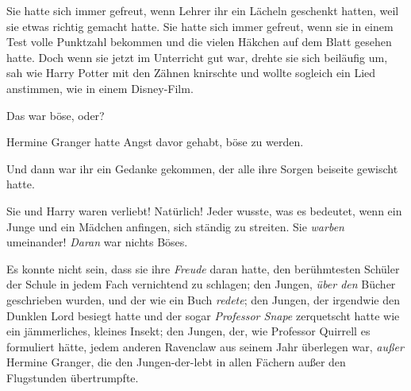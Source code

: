Sie hatte sich immer gefreut, wenn Lehrer ihr ein Lächeln geschenkt hatten, weil sie etwas richtig gemacht hatte. Sie hatte sich immer gefreut, wenn sie in einem Test volle Punktzahl bekommen und die vielen Häkchen auf dem Blatt gesehen hatte. Doch wenn sie jetzt im Unterricht gut war, drehte sie sich beiläufig um, sah wie Harry Potter mit den Zähnen knirschte und wollte sogleich ein Lied anstimmen, wie in einem Disney-Film.

Das war böse, oder?

Hermine Granger hatte Angst davor gehabt, böse zu werden.

Und dann war ihr ein Gedanke gekommen, der alle ihre Sorgen beiseite gewischt hatte.

Sie und Harry waren verliebt! Natürlich! Jeder wusste, was es bedeutet, wenn ein Junge und ein Mädchen anfingen, sich ständig zu streiten. Sie \emph{warben} umeinander! \emph{Daran} war nichts Böses.

Es konnte nicht sein, dass sie ihre \emph{Freude} daran hatte, den berühmtesten Schüler der Schule in jedem Fach vernichtend zu schlagen; den Jungen, \emph{über den} Bücher geschrieben wurden, und der wie ein Buch \emph{redete}; den Jungen, der irgendwie den Dunklen Lord besiegt hatte und der sogar \emph{Professor Snape} zerquetscht hatte wie ein jämmerliches, kleines Insekt; den Jungen, der, wie Professor Quirrell es formuliert hätte, jedem anderen Ravenclaw aus seinem Jahr überlegen war, \emph{außer} Hermine Granger, die den Jungen-der-lebt in allen Fächern außer den Flugstunden übertrumpfte.

